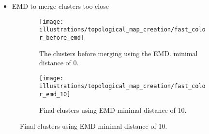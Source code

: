 \documentclass[aspectratio=169,hyperref={pdfpagelabels=false}]{beamer}
\begin{document}
    \begin{frame}
        \begin{itemize}
            \item EMD to merge clusters too close
        \end{itemize}
        \begin{figure}
            \begin{subfigure}[t]{0.45\textwidth}
                \texttt{[image: illustrations/topological\_map\_creation/fast\_color\_before\_emd]}
                \caption{The clusters before merging using the EMD. minimal distance of 0.}
                \label{fig:fast_color:before_emd}
            \end{subfigure}
            \hfill
            \begin{subfigure}[t]{0.45\textwidth}
                \texttt{[image: illustrations/topological\_map\_creation/fast\_color\_emd\_10]}
                \caption{Final clusters using EMD minimal distance of 10.}
                \label{fig:fast_color:emd_10}
            \end{subfigure}
            \hfill
        \end{figure}
    \end{frame}
\end{document}
